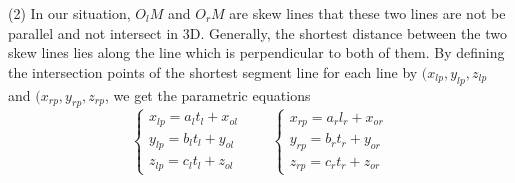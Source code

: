 (2) In our situation, $O_lM$ and $O_rM$ are skew lines that these two lines are not be parallel and not intersect in 3D. Generally, the shortest distance between the two skew lines lies along the line which is perpendicular to both of them. By defining the intersection points of the shortest segment line for each line by $(x_{lp}, y_{lp}, z_{lp}$ and $(x_{rp}, y_{rp}, z_{rp}$, we get the parametric equations
\begin{equation}  
	\left\{ 
	\begin{array}{lll} 
		x_{lp} = a_l t_l + x_{ol} \\
		y_{lp} = b_l t_l + y_{ol} \\
		z_{lp} = c_l t_l + z_{ol}
	\end{array} 
	\right.
	\qquad
	\left\{ 
	\begin{array}{lll} 
		x_{rp} = a_r l_r + x_{or} \\
		y_{rp} = b_r t_r + y_{or} \\
		z_{rp} = c_r t_r + z_{or}
	\end{array} 
	\right.
\end{equation}


